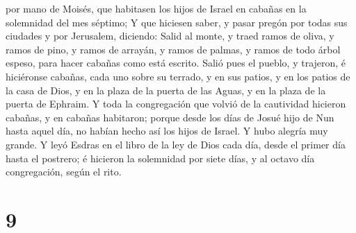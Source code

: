 por mano de Moisés, que habitasen los hijos de Israel en cabañas en la
solemnidad del mes séptimo;  Y que hiciesen saber, y
pasar pregón por todas sus ciudades y por Jerusalem, diciendo: Salid al
monte, y traed ramos de oliva, y ramos de pino, y ramos de arrayán, y
ramos de palmas, y ramos de todo árbol espeso, para hacer cabañas como
está escrito.  Salió pues el pueblo, y trajeron, é
hiciéronse cabañas, cada uno sobre su terrado, y en sus patios, y en los
patios de la casa de Dios, y en la plaza de la puerta de las Aguas, y en
la plaza de la puerta de Ephraim.  Y toda la congregación
que volvió de la cautividad hicieron cabañas, y en cabañas habitaron;
porque desde los días de Josué hijo de Nun hasta aquel día, no habían
hecho así los hijos de Israel. Y hubo alegría muy grande.
 Y leyó Esdras en el libro de la ley de Dios cada día,
desde el primer día hasta el postrero; é hicieron la solemnidad por
siete días, y al octavo día congregación, según el rito.

\hypertarget{section-8}{%
\section{9}\label{section-8}}

